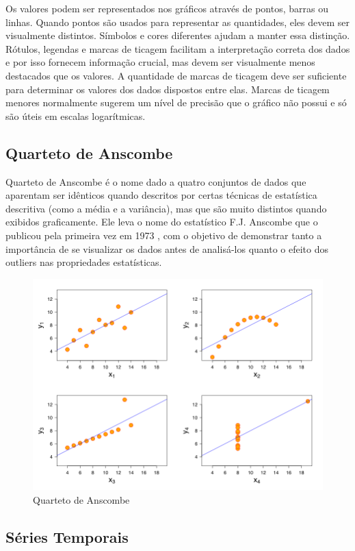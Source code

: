 \documentclass[]{article}
\begin{document}
Os valores podem ser representados nos gráficos através de pontos, barras ou linhas. 
Quando pontos são usados para representar as quantidades, eles devem ser visualmente distintos.  Símbolos e cores diferentes ajudam a manter essa distinção. Rótulos, legendas e marcas de ticagem facilitam a interpretação correta dos dados e por isso fornecem informação crucial, mas devem ser visualmente menos destacados que os valores. A quantidade de marcas de ticagem deve ser suficiente para determinar os valores dos dados dispostos entre elas. Marcas de ticagem menores normalmente sugerem um nível de precisão que o gráfico não possui e só são úteis em escalas logarítmicas.

\subsection{Quarteto de Anscombe }

Quarteto de Anscombe é o nome dado a quatro conjuntos de dados que aparentam ser idênticos quando descritos por certas técnicas de estatística descritiva (como a média e a variância), mas que são muito distintos quando exibidos graficamente. Ele leva o nome do estatístico F.J. Anscombe que o publicou pela primeira vez em 1973 , com o objetivo de demonstrar tanto a importância de se visualizar os dados antes de analisá-los quanto o efeito dos outliers nas propriedades estatísticas. \cite{1973}

\begin{figure}[!ht]
\centering
\includegraphics[scale=.7]{./anscombe}
\caption[Quarteto de Anscombe]{Quarteto de Anscombe}
\label{fig:anscombe}
\end{figure}

\subsection{Séries Temporais}
\end{document}
